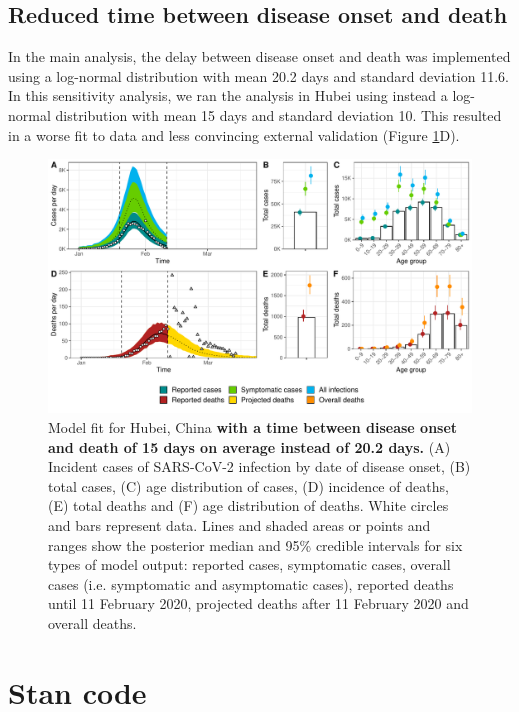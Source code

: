 \documentclass{article}
\begin{document}
\clearpage
\subsection{Reduced time between disease onset and death}

In the main analysis, the delay between disease onset and death was implemented using a log-normal distribution with mean 20.2 days and standard deviation 11.6. In this sensitivity analysis, we ran the analysis in Hubei using instead a log-normal distribution with mean 15 days and standard deviation 10. This resulted in a worse fit to data and less convincing external validation (Figure \ref{fig:fit_sst2}D).

\begin{figure}[H]
	\includegraphics[width=\linewidth]{../format_output/figures/modelfit_china_gamma15.pdf}
	\caption{Model fit for Hubei, China \textbf{with a time between disease onset and death of 15 days on average instead of 20.2 days.} (A) Incident cases of SARS-CoV-2 infection by date of disease onset, (B) total cases, (C) age distribution of cases, (D) incidence of deaths, (E) total deaths and (F) age distribution of deaths. White circles and bars represent data. Lines and shaded areas or points and ranges show the posterior median and 95\% credible intervals for six types of model output: reported cases, symptomatic cases, overall cases (i.e. symptomatic and asymptomatic cases), reported deaths until 11 February 2020, projected deaths after 11 February 2020 and overall deaths.}
	\label{fig:fit_sst2}
\end{figure}


\clearpage
\section{Stan code}
\label{code}
\end{document}
